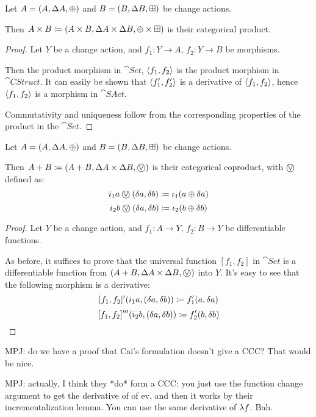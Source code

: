 \begin{prop}[Products]
  Let $A = (A,\Delta A,\oplus)$ and $B =
  (B,\Delta B,\boxplus)$ be change actions.

  Then $A \times B \coloneqq (A \times B,\Delta A \times
  \Delta B,\oplus \times \boxplus)$ is their categorical product.
\end{prop}
\ifproofs
\begin{proof}
  Let $Y$ be a change action, and $f_1: Y \rightarrow A$, $f_2: Y
  \rightarrow B$ be morphisms.

  Then the product morphism in $\cat{Set}$, $\left\langle {f_1}, {f_2} \right\rangle$ is the product
  morphism in $\cat{CStruct}$. It can easily be
  shown that $\left\langle {f_1'}, {f_2'} \right\rangle$ is a derivative of $\left\langle {f_1}, {f_2} \right\rangle$,
  hence $\left\langle {f_1}, {f_2} \right\rangle$ is a morphism in $\cat{SAct}$.

  Commutativity and uniqueness follow from the corresponding properties of the
  product in the $\cat{Set}$.
\end{proof}
\fi

\begin{prop}[Coproducts]
  Let $A = (A,\Delta A,\oplus)$ and $B =
  (B,\Delta B,\boxplus)$ be change actions.

  Then $A + B \defeq \cstruct{A + B}{\changes{A} \times
  \changes{B}}{\cplusvee}$ is their categorical coproduct, with $\cplusvee$ defined as:
  $$i_1 a \cplusvee (\change{a}, \change{b}) \defeq \iota_1 (a \cplus \change{a})$$
  $$i_2 b \cplusvee (\change{a}, \change{b}) \defeq \iota_2 (b \cplus \change{b})$$
\end{prop}
\ifproofs
\begin{proof}
  Let $Y$ be a change action, and $f_1 : A \rightarrow Y$, $f_2 : B
  \rightarrow Y$ be differentiable functions.

  As before, it suffices to prove that the universal function $[f_1, f_2]$ in $\cat{Set}$ is a differentiable
  function from $\cstruct{A + B}{\changes{A} \times \changes{B}}{\cplusvee}$ into $Y$. It's easy to see 
  that the following morphism is a derivative:
  $$[f_1, f_2]' (i_1 a, (\delta a, \delta b)) \coloneqq f_1'(a, \delta a)$$
  $$[f_1, f_2]''' (i_2 b, (\delta a, \delta b)) \coloneqq f_2'(b, \delta b)$$
\end{proof}
\fi

MPJ: do we have a proof that Cai's formulation doesn't give a CCC? That would be
nice.

MPJ: actually, I think they *do* form a CCC: you just use the function change
argument to get the derivative of of ev, and then it works by their
incrementalization lemma. You can use the same derivative of $\lambda f$. Bah.

